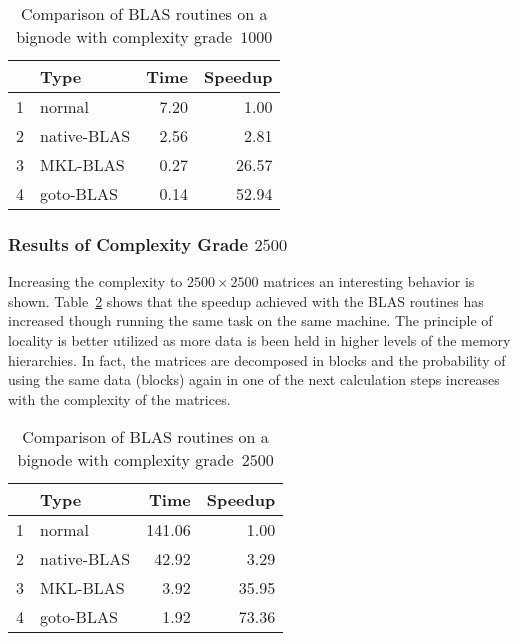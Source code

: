 \begin{table}[ht]
\begin{center}
\begin{tabular}{rlrr}
  \hline
 & Type & Time & Speedup \\
  \hline
1 & normal & 7.20 & 1.00 \\
  2 & native-BLAS & 2.56 & 2.81 \\
  3 & MKL-BLAS & 0.27 & 26.57 \\
  4 & goto-BLAS & 0.14 & 52.94 \\
   \hline
\end{tabular}
\caption{Comparison of BLAS routines on a bignode with complexity grade~$1000$}
\label{tab:mm_seqsblas1000}
\end{center}
\end{table}
\subsubsection{Results of Complexity Grade $2500$}

Increasing the complexity to $2500 \times 2500$ matrices an
interesting behavior is shown. Table~\ref{tab:mm_seqsblas2500} shows
that the speedup achieved with the BLAS routines  has increased though
running the same task on the same machine. The principle of locality
is better utilized as more data is been held in higher levels of the
memory hierarchies. In fact, the matrices are decomposed in blocks and
the probability of using the same data (blocks) again in one of the next
calculation steps increases with the complexity of the matrices.

\begin{table}[ht]
\begin{center}
\begin{tabular}{rlrr}
  \hline
 & Type & Time & Speedup \\
  \hline
1 & normal & 141.06 & 1.00 \\
  2 & native-BLAS & 42.92 & 3.29 \\
  3 & MKL-BLAS & 3.92 & 35.95 \\
  4 & goto-BLAS & 1.92 & 73.36 \\
   \hline
\end{tabular}
\caption{Comparison of BLAS routines on a bignode with complexity grade~$2500$}
\label{tab:mm_seqsblas2500}
\end{center}
\end{table}